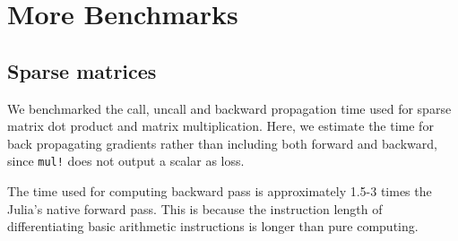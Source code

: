 \documentclass{article}
\newcommand{\<}{\langle}
\renewcommand{\>}{\rangle}
\newcommand{\ra}[1]{\renewcommand{\arraystretch}{#1}}
\theoremstyle{definition}\newtheorem{definition}{\textit{Definition}}
\begin{document}
\section{More Benchmarks}\label{app:morebenchmarks}
\subsection{Sparse matrices}\label{sec:benchsparse}
We benchmarked the call, uncall and backward propagation time used for sparse matrix dot product and matrix multiplication.
Here, we estimate the time for back propagating gradients rather than including both forward and backward, since \texttt{mul!} does not output a scalar as loss.

\begin{table}[h!]\centering
\begin{minipage}{0.8\columnwidth}
\ra{1.3}
    \caption{Absolute runtimes in seconds for computing the objectives (O) and the backward pass (B) of sparse matrix operations. The matrix size is $1000 \times 1000$, and the element density is $0.05$. The total time used in computing gradient can be estimated by summing ``O'' and ``B''.
    }\label{tbl:sparse}
\end{minipage}
\end{table}

The time used for computing backward pass is approximately 1.5-3 times the Julia's native forward pass.
This is because the instruction length of differentiating basic arithmetic instructions is longer than pure computing.
\end{document}
